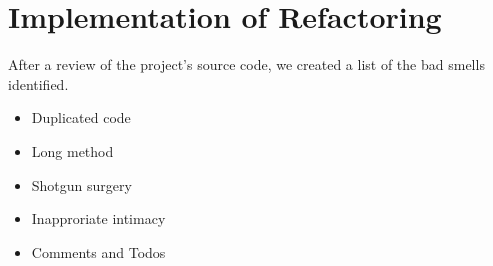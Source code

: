 \section{Implementation of Refactoring}
After a review of the project's source code, we created a list of the bad smells identified.
\begin{itemize}
\item Duplicated code
\item Long method
\item Shotgun surgery
\item Inapproriate intimacy
\item Comments and Todos
\end{itemize}

